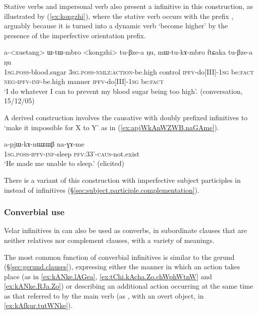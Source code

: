 Stative verbs and impersonal verb also present a  infinitive in this construction, as illustrated by (\ref{ex:kongzhi}), where the stative verb  occurs with the prefix , arguably because it is turned into a dynamic verb `become higher' by the presence of the imperfective orientation prefix.

 \begin{exe}
\ex \label{ex:kongzhi}
\gll  a-<xuetang> ɯ-tɯ-mbro <kongzhi> tu-βze-a ŋu, mɯ-tu-kɤ-mbro ftɕaka tu-βze-a ŋu \\
\textsc{1sg.poss}-blood.sugar \textsc{3sg.poss-nmlz:action}-be.high control \textsc{ipfv}-do[III]-\textsc{1sg} be:\textsc{fact} \textsc{neg-ipfv-inf}-be.high manner \textsc{ipfv}-do[III]-\textsc{1sg} be:\textsc{fact} \\
\glt `I do whatever I can to prevent my blood sugar being too high'. (conversation, 15/12/05)
\end{exe}

A derived construction involves the causative  with doubly prefixed infinitives to `make it impossible for X to Y' as in (\ref{ex:apjWkAnWZWB.naGAme}).

\begin{exe}
\ex \label{ex:apjWkAnWZWB.naGAme}
\gll a-pjɯ-kɤ-nɯʑɯβ na-ɣɤ-me \\
\textsc{1sg}.\textsc{poss}-\textsc{ipfv}-\textsc{inf}-sleep \textsc{pfv}:3\fl{}3'-\textsc{caus}-not.exist \\
\glt `He made me unable to sleep.' (elicited)
\end{exe}

There is a variant of this construction with imperfective subject participles in  instead of infinitives (§\ref{sec:subject.participle.complementation}).
 

\subsubsection{Converbial use}    \label{sec:inf.converb}
Velar infinitives in  can also be used as converbs, in subordinate clauses that are neither relatives nor complement clauses, with a variety of meanings.

The most common function of converbial infinitives is similar to the gerund (§\ref{sec:gerund.clauses}), expressing either the manner in which an action takes place (as in \ref{ex:kANke.lAGea}, \ref{ex:tChi.kAcha.Zo.chWphWtnW} and \ref{ex:kANke.RJa.Zo}) or describing an additional action occurring at the same time as that referred to by the main verb (as , with an overt object, in \ref{ex:kAfkur.tutWNke}).

